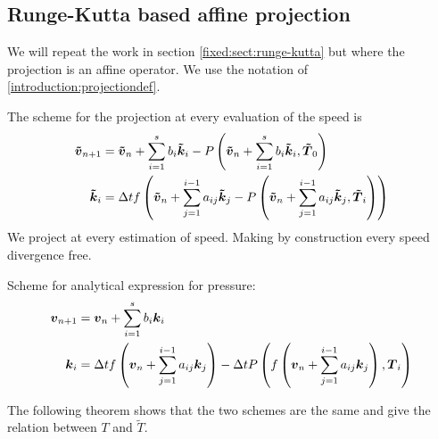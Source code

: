 \subsection{Runge-Kutta based affine projection}
\label{fixed:sect:runge-kutta:affine}
We will repeat the work in section \ref{fixed:sect:runge-kutta} but where the projection is an affine operator.
We use the notation of \ref{introduction:projectiondef}.

The scheme for the projection at every evaluation of the speed is
\begin{subequations}
\begin{align}
{\boldsymbol {\tilde{v}}}_{n+1}&={\boldsymbol {\tilde{v}}}_{n}+\sum_{i=1}^{s}b_{i}{\boldsymbol {\tilde{k}}}_{i}-P\left({\boldsymbol {\tilde{v}}}_{n}+\sum_{i=1}^{s}b_{i}{\boldsymbol {\tilde{k}}}_{i},{\boldsymbol {\tilde{T}}}_0\right)\\
{\boldsymbol {\tilde{k}}}_{i}&=\Delta t f\left({\boldsymbol {\tilde{v}}}_{n}+\sum_{j=1}^{i-1}a_{ij}{\boldsymbol {\tilde{k}}}_{j}-P\left({\boldsymbol {\tilde{v}}}_{n}+\sum_{j=1}^{i-1}a_{ij}{\boldsymbol {\tilde{k}}}_{j},{\boldsymbol {\tilde{T}}}_i\right)\right)
\end{align}
\end{subequations}
We project at every estimation of speed. Making by construction every speed divergence free.

Scheme for analytical expression for pressure:
\begin{subequations}
\begin{align}
	{\boldsymbol {v}}_{n+1}&={\boldsymbol {v}}_{n}+\sum_{i=1}^{s}b_{i}{\boldsymbol {k}}_{i}\\
	{\boldsymbol {k}}_{i}&=\Delta t f\left({\boldsymbol {v}}_{n}+\sum_{j=1}^{i-1}a_{ij}{\boldsymbol {k}}_{j}\right)-\Delta t P\left(f\left({\boldsymbol {v}}_{n}+\sum_{j=1}^{i-1}a_{ij}{\boldsymbol {k}}_{j}\right),{\boldsymbol {T}}_{i}\right)
\end{align}
\end{subequations}

The following theorem shows that the two schemes are the same and give the relation between $T$ and $\tilde{T}$.

